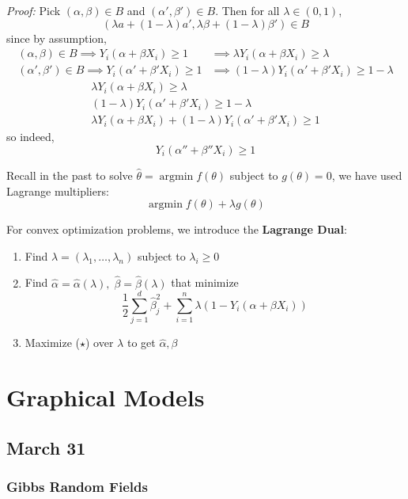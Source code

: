 \documentclass[12pt]{report}
\renewcommand{\hat}[1]{\widehat{#1}}
\newcommand*{\tbf}[1]{\ifmmode\mathbf{#1}\else\textbf{#1}\fi}
\DeclareMathOperator*{\argmin}{\arg\min}
\newenvironment*{proof}[1][blue]{
\begin{tcolorbox}[
    parbox=false,
    colback=#1!5!white,
    colframe=#1!75!black,
    breakable
]}
{\end{tcolorbox}}
\begin{document}
\begin{proof}
	\emph{Proof:} Pick $(\alpha, \beta) \in B$ and $(\alpha', \beta') \in B$. Then for all $\lambda \in (0, 1)$,
	\[(\lambda a + (1-\lambda)a', \lambda \beta + (1- \lambda)\beta') \in B\]
	since by assumption,
	\begin{align*}
		(\alpha, \beta) \in B \implies Y_i(\alpha + \beta X_i) \geq 1     & \implies \lambda Y_i(\alpha + \beta X_i) \geq \lambda         \\
		(\alpha', \beta') \in B \implies Y_i(\alpha' + \beta' X_i) \geq 1 & \implies (1-\lambda) Y_i(\alpha' + \beta' X_i) \geq 1-\lambda
	\end{align*}
	\[\begin{array}{rl}
			\lambda Y_i(\alpha + \beta X_i) \geq \lambda         \\
			(1-\lambda) Y_i(\alpha' + \beta' X_i) \geq 1-\lambda \\ \hline
			\lambda Y_i(\alpha + \beta X_i) + (1-\lambda) Y_i(\alpha' + \beta' X_i) \geq 1
		\end{array}\]
	so indeed,
	\[Y_i(\alpha'' + \beta'' X_i) \geq 1\]
\end{proof}

Recall in the past to solve $\hat \theta = \argmin f(\theta)$ subject to $g(\theta) = 0$, we have used Lagrange multipliers:
\[\argmin f(\theta) + \lambda g(\theta)\]

For convex optimization problems, we introduce the \tbf{Lagrange Dual}:
\begin{enumerate}
	\item Find $\lambda = (\lambda_1, \dots, \lambda_n)$ subject to $\lambda_i \geq 0$
	\item Find $\hat \alpha = \hat \alpha(\lambda),\; \hat \beta = \hat \beta(\lambda)$ that minimize
	      \[\frac{1}{2}\sum_{j=1}^d \hat \beta_j^2 + \sum_{i=1}^n \lambda (1 - Y_i(\alpha + \beta X_i)) \tag{$\star$}\]
	\item Maximize ($\star$) over $\lambda$ to get $\hat \alpha, \beta$
\end{enumerate}

\chapter{Graphical Models}
\section{March 31}
\subsection{Gibbs Random Fields}
\end{document}
